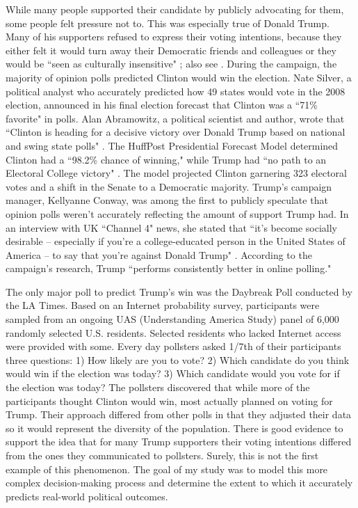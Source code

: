 While many people supported their candidate by publicly advocating for them,
some people felt pressure not to. This was especially true of Donald Trump.
Many of his supporters refused to express their voting intentions, because
they either felt it would turn away their Democratic friends and colleagues or
they would be ``seen as culturally insensitive" \cite{simmons_for_2017}; also
see \citep{shepard_gop_2016}. During the campaign, the majority of opinion
polls predicted Clinton would win the election. Nate Silver, a political
analyst who accurately predicted how 49 states would vote in the 2008
election, announced in his final election forecast that Clinton was a ``71\%
favorite" in polls. Alan Abramowitz, a political scientist and author, wrote
that ``Clinton is heading for a decisive victory over Donald Trump based on
national and swing state polls" \citep{abramowitz_history_2016}. The HuffPost
Presidential Forecast Model determined Clinton had a ``98.2\% chance of
winning," while Trump had ``no path to an Electoral College victory"
\citep{jackson_huffpost_2016}. The model projected Clinton garnering 323
electoral votes and a shift in the Senate to a Democratic majority. Trump's
campaign manager, Kellyanne Conway, was among the first to publicly speculate
that opinion polls weren't accurately reflecting the amount of support Trump
had. In an interview with UK ``Channel 4" news, she stated that ``it's become
socially desirable -- especially if you're a college-educated person in the
United States of America -- to say that you're against Donald Trump"
\citep{wright_donald_2016}. According to the campaign's research, Trump
``performs consistently better in online polling."

The only major poll to predict Trump's win was the Daybreak Poll conducted by
the LA Times. Based on an Internet probability survey, participants were
sampled from an ongoing UAS (Understanding America Study) panel of 6,000
randomly selected U.S. residents. Selected residents who lacked Internet
access were provided with some. Every day pollsters asked 1/7th of their
participants three questions: 1) How likely are you to vote? 2) Which
candidate do you think would win if the election was today? 3) Which candidate
would you vote for if the election was today? The pollsters discovered that
while more of the participants thought Clinton would win, most actually
planned on voting for Trump. Their approach differed from other polls in that
they adjusted their data so it would represent the diversity of the
population. There is good evidence to support the idea that for many Trump
supporters their voting intentions differed from the ones they communicated to
pollsters. Surely, this is not the first example of this phenomenon. The goal
of my study was to model this more complex decision-making process and
determine the extent to which it accurately predicts real-world political
outcomes.

